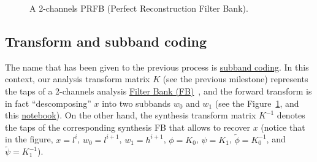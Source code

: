 \begin{figure}
  \centering
  \caption{A 2-channels PRFB (Perfect Reconstruction Filter Bank).}
  \label{fig:PRFB}
\end{figure}

\subsection{Transform and subband coding}
The name that has been given to the previous process is
\href{https://en.wikipedia.org/wiki/Sub-band_coding}{subband
  coding}. In this context, our analysis transform matrix $K$ (see the
previous milestone) represents the taps of a 2-channels analysis
\href{https://en.wikipedia.org/wiki/Filter_bank}{Filter Bank
  (FB)}~\cite{vetterli1995wavelets}, and the forward transform is in
fact ``descomposing'' $x$ into two subbands $w_0$ and $w_1$ (see the
Figure~\ref{fig:PRFB}, and this
\href{https://github.com/Tecnologias-multimedia/intercom/blob/master/docs/PRFB.ipynb}{notebook}). On
the other hand, the synthesis transform matrix $K^{-1}$ denotes the
taps of the corresponding synthesis FB that allows to recover $x$
(notice that in the figure, $x=l^i$, $w_0=l^{i+1}$, $w_1=h^{i+1}$,
$\phi=K_0$, $\psi=K_1$, $\tilde\phi=K^{-1}_0$, and
$\tilde\psi=K^{-1}_1$).


